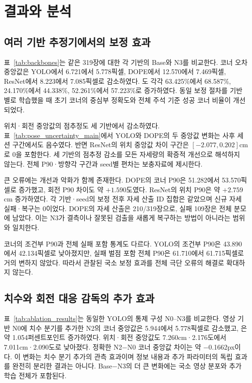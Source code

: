 \section{결과와 분석}\label{sec:results}
\subsection{여러 기반 추정기에서의 보정 효과}
표~\ref{tab:backbones}는 같은 319장에 대한 각 기반의 Base와 N3를 비교한다. 코너 오차 중앙값은 YOLO에서 6.721에서 5.778픽셀, DOPE에서 12.570에서 7.469픽셀, ResNet에서 8.223에서 7.085픽셀로 감소하였다. \pckten 도 각각 63.425\%에서 68.587\%, 24.170\%에서 44.338\%, 52.261\%에서 57.223\%로 증가하였다. 동일 보정 절차를 기반별로 학습했을 때 초기 코너의 중심부 정확도와 전체 주석 기준 성공 코너 비율이 개선되었다.

위치·회전 중앙값의 점추정도 세 기반에서 감소하였다. 표~\ref{tab:pose_uncertainty_main}에서 YOLO와 DOPE의 두 중앙값 변화는 사후 세션 구간에서도 음수였다. 반면 ResNet의 위치 중앙값 차이 구간은 $[-2.077,0.202]$cm로 0을 포함한다. 세 기반의 점추정 감소를 모든 자세량의 확증적 개선으로 해석하지 않는다. 전체 P90·방향각 구간과 seed별 편차는 보충자료에 제시한다.



큰 오류에는 개선과 악화가 함께 존재한다. DOPE의 코너 P90은 51.282에서 53.570픽셀로 증가했고, 회전 P90 차이도 약 $+1.590$도였다. ResNet의 위치 P90은 약 $+2.759$cm 증가하였다. 각 기반·seed의 보정 전후 자세 산출 ID 집합은 같았으며 신규 자세 실패·복구는 0이었다. DOPE의 자세 산출은 210/319장으로, 실패 109장은 전체 분모에 남았다. 이는 N3가 결측이나 잘못된 검출을 새롭게 복구하는 방법이 아니라는 범위와 일치한다.

코너의 조건부 P90과 전체 실패 포함 통계도 다르다. YOLO의 조건부 P90은 43.890에서 42.134픽셀로 낮아졌지만, 실패 벌점 포함 전체 P90은 61.710에서 61.715픽셀로 거의 변하지 않았다. 따라서 관찰된 국소 보정 효과를 전체 극단 오류의 해결로 확대하지 않는다.

\subsection{치수와 회전 대응 감독의 추가 효과}
표~\ref{tab:ablation_results}는 동일한 YOLO의 통제 구성 N0--N3를 비교한다. 영상 기반 N0에 치수 분기를 추가한 N2의 코너 중앙값은 5.944에서 5.778픽셀로 감소했고, \pckten 은 약 1.054퍼센트포인트 증가하였다. 위치·회전 중앙값도 7.260cm·2.176도에서 7.011cm·2.090도로 낮아졌다. 정확한 N2−N0 코너 중앙값 차이는 약 −0.1662px이다. 이 변화는 치수 분기 추가의 관측 효과이며 정보 내용과 추가 파라미터의 독립 효과를 완전히 분리한 결과는 아니다. Base−N3의 더 큰 변화에는 국소 영상 분포와 추가 학습 전체가 포함된다.


